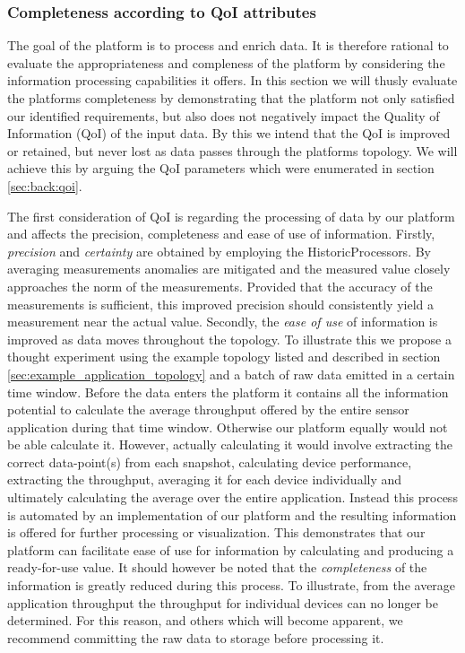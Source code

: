 \subsubsection*{Completeness according to QoI attributes}
The goal of the platform is to process and enrich data. It is therefore rational to evaluate the appropriateness and compleness of the platform by considering the information processing capabilities it offers. In this section we will thusly evaluate the platforms completeness by demonstrating that the platform not only satisfied our identified requirements, but also does not negatively impact the Quality of Information (QoI) of the input data. By this we intend that the QoI is improved or retained, but never lost as data passes through the platforms topology. We will achieve this by arguing the QoI parameters which were enumerated in section \ref{sec:back:qoi}. 

The first consideration of QoI is regarding the processing of data by our platform and affects the precision, completeness and ease of use of information. Firstly, \emph{precision} and \emph{certainty} are obtained by employing the HistoricProcessors. By averaging measurements anomalies are mitigated and the measured value closely approaches the norm of the measurements. Provided that the accuracy of the measurements is sufficient, this improved precision should consistently yield a measurement near the actual value. Secondly, the \emph{ease of use} of information is improved as data moves throughout the topology. To illustrate this we propose a thought experiment using the example topology listed and described in section \ref{sec:example_application_topology} and a batch of raw data emitted in a certain time window. Before the data enters the platform it contains all the information potential to calculate the average throughput offered by the entire sensor application during that time window. Otherwise our platform equally would not be able calculate it. However, actually calculating it would involve extracting the correct data-point(s) from each snapshot, calculating device performance, extracting the throughput, averaging it for each device individually and ultimately calculating the average over the entire application. Instead this process is automated by an implementation of our platform and the resulting information is offered for further processing or visualization. This demonstrates that our platform can facilitate ease of use for information by calculating and producing a ready-for-use value. It should however be noted that the \emph{completeness} of the information is greatly reduced during this process. To illustrate, from the average application throughput the throughput for individual devices can no longer be determined. For this reason, and others which will become apparent, we recommend committing the raw data to storage before processing it.

